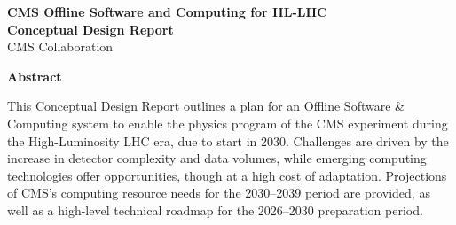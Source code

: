 \vspace{2cm}

\begin{center}
{\Large\sffamily\bfseries CMS Offline Software and Computing for HL-LHC}\\[5mm]
{\Large\sffamily\bfseries Conceptual Design Report}\\[10mm]
{\Large\sffamily CMS Collaboration}
\end{center}

\vspace{1cm}

\begin{center}
\textbf{\Large Abstract}
\end{center}

This Conceptual Design Report outlines a plan for an Offline Software \& Computing system to enable the physics program of the CMS experiment during the High-Luminosity LHC era, due to start in 2030. Challenges are driven by the increase in detector complexity and data volumes, while emerging computing technologies offer opportunities, though at a high cost of adaptation. Projections of CMS’s computing resource needs for the 2030--2039 period are provided, as well as a high-level technical roadmap for the 2026--2030 preparation period. 

\vspace*{\fill}

\cleardoublepage




\pagestyle{fancy}

